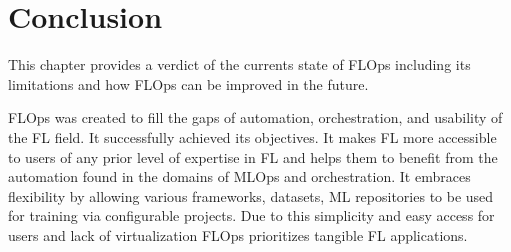 \chapter{Conclusion}\label{chapter:conclusion}

This chapter provides a verdict of the currents state of FLOps including its limitations and how FLOps can be improved in the future.

FLOps was created to fill the gaps of automation, orchestration, and usability of the FL field.
It successfully achieved its objectives.
It makes FL more accessible to users of any prior level of expertise in FL and helps them to benefit from the automation found in the domains of MLOps and orchestration.
It embraces flexibility by allowing various frameworks, datasets, ML repositories to be used for training via configurable projects.
Due to this simplicity and easy access for users and lack of virtualization FLOps prioritizes tangible FL applications.

